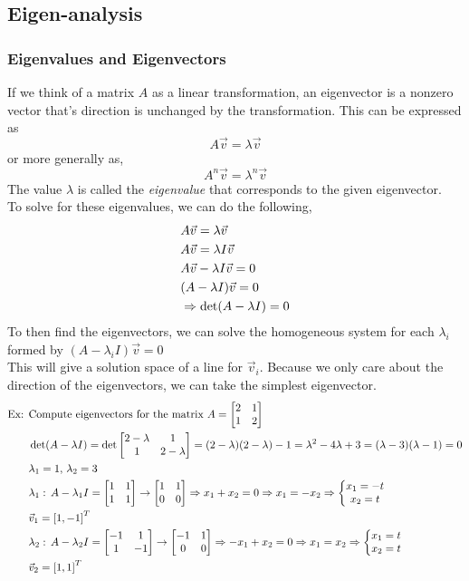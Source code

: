 \documentclass[11pt, fleqn]{article}
\begin{document}
\subsection{Eigen-analysis}

\subsubsection{Eigenvalues and Eigenvectors}
If we think of a matrix $A$ as a linear transformation, an eigenvector is a nonzero vector that's direction is unchanged by the transformation. This can be expressed as
$$A\vec{v}=\lambda\vec{v}$$
or more generally as,
$$A^n\vec{v}=\lambda^n\vec{v}$$
The value $\lambda$ is called the \textit{eigenvalue} that corresponds to the given eigenvector.\\
To solve for these eigenvalues, we can do the following,
\begin{align*}
    &A\vec{v}=\lambda\vec{v}\\
    &A\vec{v}=\lambda I\vec{v}\\
    &A\vec{v}-\lambda I\vec{v}=0\\
    &(A-\lambda I)\vec{v}=0\\
    &\Rightarrow \det(A-\lambda I)=0
\end{align*}
To then find the eigenvectors, we can solve the homogeneous system for each $\lambda_i$ formed by $(A-\lambda_i I)\vec{v}=0$\\
This will give a solution space of a line for $\vec{v}_i$. Because we only care about the direction of the eigenvectors, we can take the simplest eigenvector.
\begin{align*}
    \text{Ex: }&\text{Compute eigenvectors for the matrix }A=\matrixx{2&1\\1&2}\\
    &\det(A-\lambda I)=\det\matrixx{2-\lambda&1\\1&2-\lambda}=(2-\lambda)(2-\lambda)-1=\lambda^2-4\lambda+3=(\lambda-3)(\lambda-1)=0\\
    &\lambda_1=1,\,\lambda_2=3\\
    &\lambda_1:\,A-\lambda_1I=\matrixx{1&1\\1&1}\to\matrixx{1&1\\0&0}\Ra x_1+x_2=0\Ra x_1=-x_2\Ra \eqnsystem{x_1=-t\\x_2=t}\\
    &\vec{v}_1=\brsquare{1,-1}^T\\
    &\lambda_2:\,A-\lambda_2 I=\matrixx{-1&1\\1&-1}\to\matrixx{-1&1\\0&0}\Ra -x_1+x_2=0\Ra x_1=x_2\Ra \eqnsystem{x_1=t\\x_2=t}\\
    &\vec{v}_2=\brsquare{1,1}^T
\end{align*}
\end{document}
